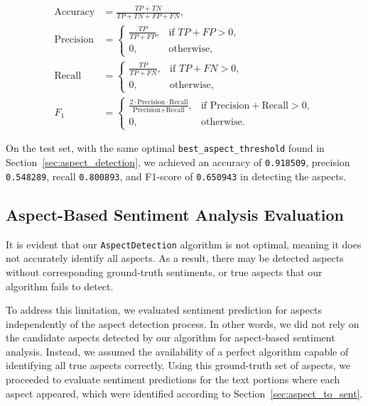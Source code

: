 \begin{equation*}
\begin{aligned}
\text{Accuracy} & = \frac{TP + TN}{TP + TN + FP + FN}, \\
\text{Precision} & =
\begin{cases}
\frac{TP}{TP + FP}, & \text{if } TP + FP > 0, \\
0, & \text{otherwise},
\end{cases} \\
\text{Recall} & =
\begin{cases}
\frac{TP}{TP + FN}, & \text{if } TP + FN > 0, \\
0, & \text{otherwise},
\end{cases} \\
F_1 & =
\begin{cases}
\frac{2 \cdot \text{Precision} \cdot \text{Recall}}{\text{Precision} + \text{Recall}}, & \text{if } \text{Precision} + \text{Recall} > 0, \\
0, & \text{otherwise}.
\end{cases}
\end{aligned}
\end{equation*}

On the test set, with the same optimal \texttt{best\_aspect\_threshold} found in Section~\ref{sec:aspect_detection}, we achieved an accuracy of \texttt{0.918509}, precision \texttt{0.548289}, recall \texttt{0.800893}, and F1-score of \texttt{0.650943} in detecting the aspects.


\subsection{Aspect-Based Sentiment Analysis Evaluation}

It is evident that our \texttt{AspectDetection} algorithm is not optimal, meaning it does not accurately identify all aspects. As a result, there may be detected aspects without corresponding ground-truth sentiments, or true aspects that our algorithm fails to detect.

To address this limitation, we evaluated sentiment prediction for aspects independently of the aspect detection process. In other words, we did not rely on the candidate aspects detected by our algorithm for aspect-based sentiment analysis. Instead, we assumed the availability of a perfect algorithm capable of identifying all true aspects correctly. Using this ground-truth set of aspects, we proceeded to evaluate sentiment predictions for the text portions where each aspect appeared, which were identified according to Section~\ref{sec:aspect_to_sent}. 

